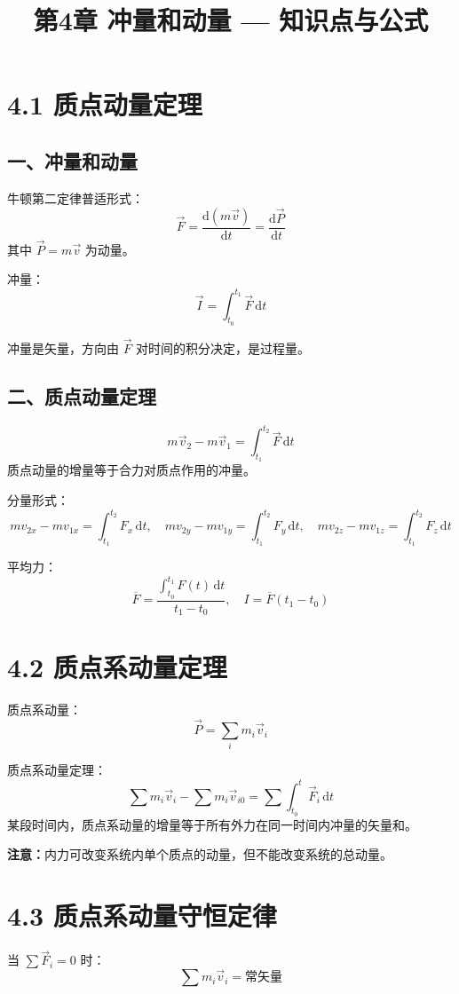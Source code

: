 \documentclass{ctexart}
\title{\textbf{第4章 冲量和动量} --- 知识点与公式}
\author{}
\date{}
\begin{document}
\maketitle

\section*{4.1 质点动量定理}

\subsection*{一、冲量和动量}
牛顿第二定律普适形式：
\[
\vec{F} = \frac{\mathrm{d}(m\vec{v})}{\mathrm{d}t} = \frac{\mathrm{d}\vec{P}}{\mathrm{d}t}
\]
其中 $\vec{P} = m\vec{v}$ 为动量。

冲量：
\[
\vec{I} = \int_{t_0}^{t_1} \vec{F}\,\mathrm{d}t
\]

冲量是矢量，方向由 $\vec{F}$ 对时间的积分决定，是过程量。

\subsection*{二、质点动量定理}
\[
m\vec{v}_2 - m\vec{v}_1 = \int_{t_1}^{t_2} \vec{F}\,\mathrm{d}t
\]
质点动量的增量等于合力对质点作用的冲量。

分量形式：
\[
mv_{2x} - mv_{1x} = \int_{t_1}^{t_2} F_x\,\mathrm{d}t,\quad
mv_{2y} - mv_{1y} = \int_{t_1}^{t_2} F_y\,\mathrm{d}t,\quad
mv_{2z} - mv_{1z} = \int_{t_1}^{t_2} F_z\,\mathrm{d}t
\]

平均力：
\[
\overline{F} = \frac{\int_{t_0}^{t_1} F(t)\,\mathrm{d}t}{t_1 - t_0},\quad
I = \overline{F}(t_1 - t_0)
\]

\section*{4.2 质点系动量定理}
质点系动量：
\[
\vec{P} = \sum_i m_i\vec{v}_i
\]

质点系动量定理：
\[
\sum m_i\vec{v}_i - \sum m_i\vec{v}_{i0} = \sum \int_{t_0}^{t} \vec{F}_i\,\mathrm{d}t
\]
某段时间内，质点系动量的增量等于所有外力在同一时间内冲量的矢量和。

\textbf{注意：}内力可改变系统内单个质点的动量，但不能改变系统的总动量。

\section*{4.3 质点系动量守恒定律}
当 $\sum \vec{F}_i = 0$ 时：
\[
\sum m_i\vec{v}_i = \text{常矢量}
\]
\end{document}

